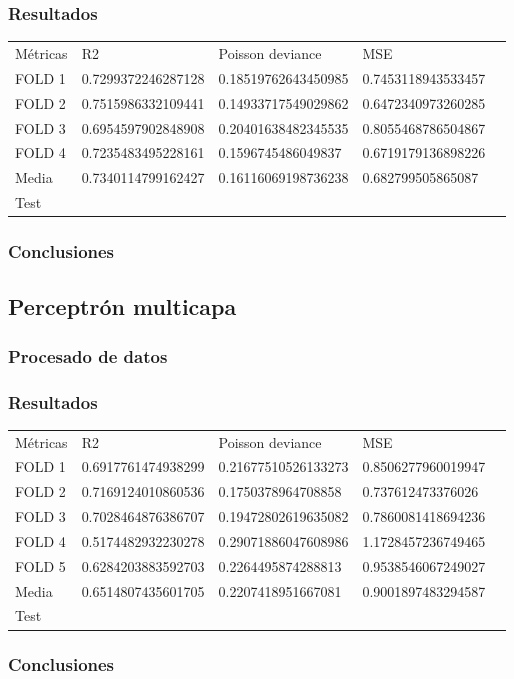 \subsubsection{Resultados}
\begin{table}[htbp]
    \begin{tabular}{|l|l|l|l|l}
    \cline{1-4}
    Métricas & R2                 & Poisson deviance     & MSE                \\ \cline{1-4}
    FOLD 1    & 0.7299372246287128 & 0.18519762643450985 & 0.7453118943533457 \\ \cline{1-4}
    FOLD 2    & 0.7515986332109441 & 0.14933717549029862 & 0.6472340973260285 \\ \cline{1-4}
    FOLD 3    & 0.6954597902848908 & 0.20401638482345535 & 0.8055468786504867 \\ \cline{1-4}
    FOLD 4    & 0.7235483495228161 & 0.1596745486049837  & 0.6719179136898226 \\ \cline{1-4}
    Media     & 0.7340114799162427 & 0.16116069198736238 & 0.682799505865087  \\ \cline{1-4}
    Test & & & \\ \cline{1-4}
\end{tabular}
\end{table}
\subsubsection{Conclusiones}

\subsection{Perceptrón multicapa}
\subsubsection{Procesado de datos}
\subsubsection{Resultados}
\begin{table}[htbp]
    \begin{tabular}{|l|l|l|l|l}
    \cline{1-4}
    Métricas & R2                  & Poisson deviance    & MSE                \\ \cline{1-4}
    FOLD 1   & 0.6917761474938299  & 0.21677510526133273 & 0.8506277960019947 \\ \cline{1-4}
    FOLD 2   & 0.7169124010860536  & 0.1750378964708858  & 0.737612473376026  \\ \cline{1-4}
    FOLD 3   & 0.7028464876386707  & 0.19472802619635082 & 0.7860081418694236 \\ \cline{1-4}
    FOLD 4   & 0.5174482932230278  & 0.29071886047608986 & 1.1728457236749465 \\ \cline{1-4}
    FOLD 5   & 0.6284203883592703  & 0.2264495874288813  & 0.9538546067249027 \\ \cline{1-4}
    Media    & 0.6514807435601705  & 0.2207418951667081  & 0.9001897483294587 \\ \cline{1-4}
    Test & & & \\ \cline{1-4}
\end{tabular}
\end{table}
\subsubsection{Conclusiones}
